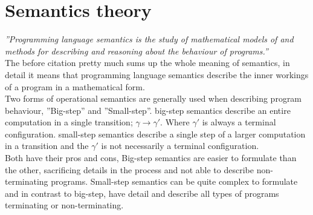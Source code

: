 \section{Semantics theory}\label{sec:semantic}
\emph{''Programming language semantics is the study of mathematical models of and methods for describing and reasoning about the behaviour of programs.''}\cite{transtrees}\\
The before citation pretty much sums up the whole meaning of semantics, in detail it means that programming language semantics describe the inner workings of a program in a mathematical form.\\
Two forms of operational semantics are generally used when describing program behaviour, ''Big-step'' and ''Small-step''.
big-step semantics describe an entire computation in a single transition;
$ \gamma \rightarrow \gamma' $.
Where $\gamma'$ is always a terminal configuration.
small-step semantics describe a single step of a larger computation in a transition and the $ \gamma' $ is not necessarily a terminal configuration.\\
Both have their pros and cons, Big-step semantics are easier to formulate than the other, sacrificing details in the process and not able to describe non-terminating programs. Small-step semantics can be quite complex to formulate and in contrast to big-step, have detail and describe all types of programs terminating or non-terminating.\cite{opsemantics}\cite{transtrees}

